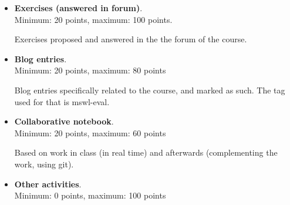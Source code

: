 \documentclass[a4paper]{article}
\begin{document}
\begin{itemize}
\item \textbf{Exercises (answered in forum)}. \\
  Minimum: 20 points, maximum: 100 points.

  Exercises proposed and answered in the the forum of the course.

\item \textbf{Blog entries}. \\
  Minimum: 20 points, maximum: 80 points

  Blog entries specifically related to the course, and marked as such. The tag used for that is mswl-eval.

\item \textbf{Collaborative notebook}. \\
  Minimum: 20 points, maximum: 60 points

  Based on work in class (in real time) and afterwards (complementing the work, using git).


\item \textbf{Other activities}. \\
  Minimum: 0 points, maximum: 100 points

\end{itemize}
\end{document}

